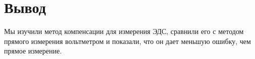 \section{Вывод}

Мы изучили метод компенсации для измерения ЭДС, сравнили его с методом прямого измерения вольтметром и показали, что он дает меньшую ошибку, чем прямое измерение.